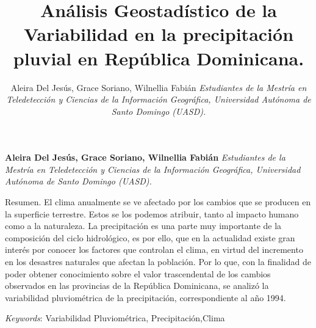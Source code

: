 \documentclass[11pt,]{article}
\title{Análisis Geostadístico de la Variabilidad en la precipitación pluvial en
República Dominicana.  }
\author{\Large Aleira Del Jesús, Grace Soriano, Wilnellia Fabián\vspace{0.05in} \newline\normalsize\emph{Estudiantes de la Mestría en Teledetección y Ciencias de la Información
Geográfica, Universidad Autónoma de Santo Domingo (UASD).}  }
\date{}
\newcommand*{\authorfont}{\fontfamily{phv}\selectfont}
\renewenvironment{abstract}
 {{%
    \setlength{\leftmargin}{0mm}
    \setlength{\rightmargin}{\leftmargin}%
  }%
  \relax}
 {\endlist}
\begin{document}
	
%

{%
\setlength{\parindent}{0pt}
\thispagestyle{plain}
{\fontsize{18}{20}\selectfont\raggedright 
\maketitle  %

}

{
   \vskip 13.5pt\relax \normalsize\fontsize{11}{12} 
\textbf{\authorfont Aleira Del Jesús, Grace Soriano, Wilnellia Fabián} \hskip 15pt \emph{\small Estudiantes de la Mestría en Teledetección y Ciencias de la Información
Geográfica, Universidad Autónoma de Santo Domingo (UASD).}   

}

}








\begin{abstract}

    \hbox{\vrule height .2pt width 39.14pc}

    \vskip 8.5pt %

\noindent Resumen. El clima anualmente se ve afectado por los cambios que se
producen en la superficie terrestre. Estos se los podemos atribuir,
tanto al impacto humano como a la naturaleza. La precipitación es una
parte muy importante de la composición del ciclo hidrológico, es por
ello, que en la actualidad existe gran interés por conocer los factores
que controlan el clima, en virtud del incremento en los desastres
naturales que afectan la población. Por lo que, con la finalidad de
poder obtener conocimiento sobre el valor trascendental de los cambios
observados en las provincias de la República Dominicana, se analizó la
variabilidad pluviométrica de la precipitación, correspondiente al año
1994.


\vskip 8.5pt \noindent \emph{Keywords}: Variabilidad Pluviométrica, Precipitación,Clima \par

    \hbox{\vrule height .2pt width 39.14pc}



\end{abstract}
\end{document}
